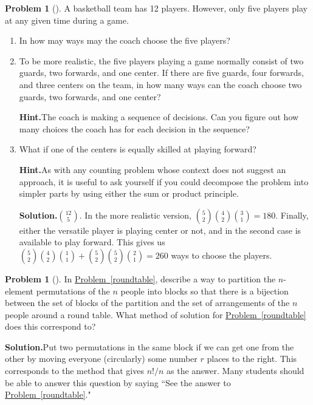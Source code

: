 \documentclass[10pt,]{book}
\theoremstyle{plain}
\theoremstyle{definition}
\newtheorem{activity}[project]{Problem}
\theoremstyle{definition}
\numberwithin{equation}{chapter}
\begin{document}
\begin{activity}[]\label{activity-40}
A basketball team has 12 players. However, only five players play at any given time during a game.%
\begin{enumerate}[font=\bfseries,label=(\alph*),ref=\alph*]
\item\label{task-38} In how may ways may the coach choose the five players?%
\item\label{task-39} To be more realistic, the five players playing a game normally consist of two guards, two forwards, and one center.  If there are five guards, four forwards, and three centers on the team, in how many ways can the coach choose two guards, two forwards, and one center?%
\par\medskip\noindent%
\textbf{Hint.}\quad The coach is making a sequence of decisions. Can you figure out how many choices the coach has for each decision in the sequence?%
\item\label{task-40} What if one of the centers is equally skilled at playing forward?%
\par\medskip\noindent%
\textbf{Hint.}\quad As with any counting problem whose context does not suggest an approach, it is useful to ask yourself if you could decompose the problem into simpler parts by using either the sum or product principle.%
\par\medskip\noindent%
\textbf{Solution.}\quad \(\binom{12}{5}\). In the more realistic version, \(\binom{5}{2}\binom{4}{2}\binom{3}{1}=180\). Finally, either the versatile player is playing center or not, and in the second case is available to play forward. This gives us \(\binom{5}{2}\binom{4}{2} \binom{1}{1}+\binom{5}{2}\binom{5}{2}\binom{2}{1}=260\) ways to choose the players.%
\end{enumerate}
\end{activity}
\begin{activity}[]\label{roundtablepartition}
In \hyperref[roundtable]{Problem~\ref{roundtable}}, describe a way to partition the \(n\)-element permutations of the \(n\) people into blocks so that there is a bijection between the set of blocks of the partition and the set of arrangements of the \(n\) people around a round table. What method of solution for \hyperref[roundtable]{Problem~\ref{roundtable}} does this correspond to?%
\par\medskip\noindent%
\textbf{Solution.}\quad Put two permutations in the same block if we can get one from the other by moving everyone (circularly) some number \(r\) places to the right. This corresponds to the method that gives \(n!/n\) as the answer. Many students should be able to answer this question by saying ``See the answer to \hyperref[roundtable]{Problem~\ref{roundtable}}."%
\end{activity}
\end{document}
